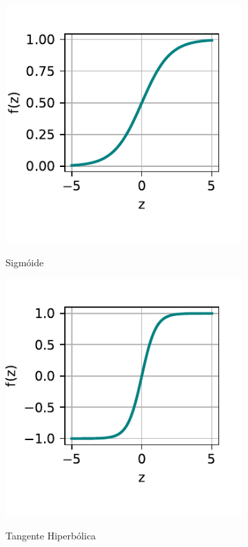 \begin{figure}[H]
    \centering
    \caption{Exemplos de funções de ativação de um neurônio para uma rede neural.}
    \begin{subfigure}[H]{.4\textwidth}
        \centering
        \caption{Sigmóide}
        \includegraphics[scale=0.8]{img/img-fundamentacao-sig.pdf}
        \label{fig:fund-funcs-sig}
    \end{subfigure}
    \begin{subfigure}[H]{.4\textwidth}
        \centering
        \caption{Tangente Hiperbólica}
        \includegraphics[scale=0.8]{img/img-fundamentacao-tanh.pdf}
        \label{fig:fund-funcs-tanh}
    \end{subfigure}
    \begin{subfigure}[H]{.4\textwidth}

\end{subfigure}
\end{figure}
